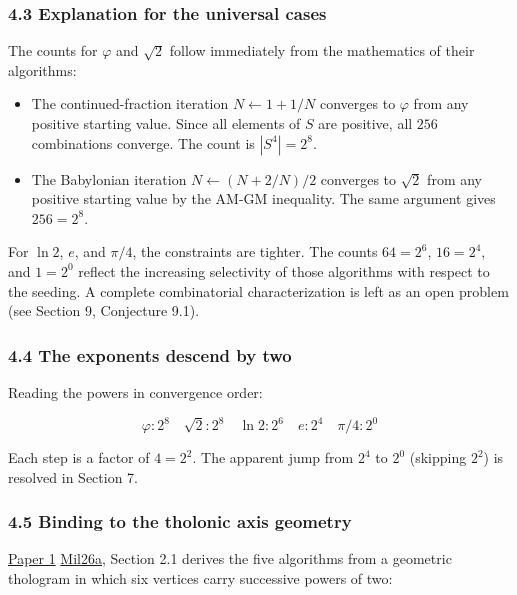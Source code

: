 \documentclass[
  11pt,
  letterpaper,
]{article}
\begin{document}
\subsubsection{4.3 Explanation for the universal
cases}\label{explanation-for-the-universal-cases}

The counts for \(\varphi\) and \(\sqrt{2}\) follow immediately from the
mathematics of their algorithms:

\begin{itemize}
\item
  The continued-fraction iteration \(N \leftarrow 1 + 1/N\) converges to
  \(\varphi\) from any positive starting value. Since all elements of
  \(S\) are positive, all \(256\) combinations converge. The count is
  \(|S^4| = 2^8\).
\item
  The Babylonian iteration \(N \leftarrow (N + 2/N)/2\) converges to
  \(\sqrt{2}\) from any positive starting value by the AM-GM inequality.
  The same argument gives \(256 = 2^8\).
\end{itemize}

For \(\ln 2\), \(e\), and \(\pi/4\), the constraints are tighter. The
counts \(64 = 2^6\), \(16 = 2^4\), and \(1 = 2^0\) reflect the
increasing selectivity of those algorithms with respect to the seeding.
A complete combinatorial characterization is left as an open problem
(see Section 9, Conjecture 9.1).

\subsubsection{4.4 The exponents descend by
two}\label{the-exponents-descend-by-two}

Reading the powers in convergence order:

\[
\varphi: 2^8 \quad \sqrt{2}: 2^8 \quad \ln 2: 2^6 \quad e: 2^4 \quad \pi/4: 2^0
\]

Each step is a factor of \(4 = 2^2\). The apparent jump from \(2^4\) to
\(2^0\) (skipping \(2^2\)) is resolved in Section 7.

\subsubsection{4.5 Binding to the tholonic axis
geometry}\label{binding-to-the-tholonic-axis-geometry}

\href{https://github.com/baardev/truevalue/blob/main/docnav/Research/papers/1_recursive-tholonic-five-constants/1_recursive-tholonic-five-constants.pdf}{Paper
1}
\href{https://github.com/baardev/truevalue/blob/main/docnav/Research/papers/1_recursive-tholonic-five-constants/1_recursive-tholonic-five-constants.pdf}{Mil26a},
Section 2.1 derives the five algorithms from a geometric thologram in
which six vertices carry successive powers of two:
\end{document}

